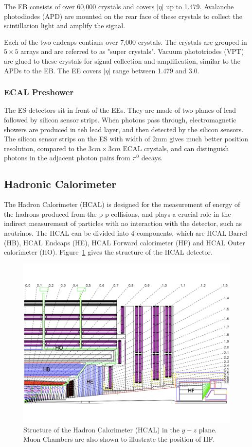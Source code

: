 \vspace{0.3cm}
The EB consists of over 60,000 crystals and covers $|\eta|$ up to 1.479. Avalanche photodiodes (APD) are mounted on the rear face of these crystals to collect the scintillation light and amplify the signal. 

\vspace{0.3cm}
Each of the two endcaps contians over 7,000 crystals. The crystals are grouped in $5\times 5$ arrays and are referred to as "super crystals". Vacuum phototriodes (VPT) are glued to these crystals for signal collection and amplification, similar to the APDs to the EB. The EE covers $|\eta|$ range between 1.479 and 3.0. 

\subsubsection{ECAL Preshower}
The ES detectors sit in front of the EEs. They are made of two planes of lead followed by silicon sensor strips. When photons pass through, electromagnetic showers are produced in teh lead layer, and then detected by the silicon sensors. The silicon sensor strips on the ES with width of 2mm gives much better position resolution, compared to the $3cm\times 3cm$ ECAL crystals, and can distinguish photons in the adjacent photon pairs from $\pi^{0}$ decays.

\subsection{Hadronic Calorimeter} 
The Hadron Calorimeter (HCAL)\cite{lhc_hcaldesign} is designed for the measurement of energy of the hadrons produced from the p-p collisions, and plays a crucial role in the indirect measurement of particles with no interaction with the detector, such as neutrinos. The HCAL can be divided into 4 components, which are HCAL Barrel (HB), HCAL Endcaps (HE), HCAL Forward calorimeter (HF) and HCAL Outer calorimeter (HO). Figure~\ref{fig:lhc_hcaldesign} gives the structure of the HCAL detector.
\begin{figure}[htbp]
\begin{center}
\includegraphics[width=0.7\linewidth]{figures/lhc_hcaldesign.pdf}
\caption{Structure of the Hadron Calorimeter (HCAL) in the $y-z$ plane. Muon Chambers are also shown to illustrate the position of HF.}
\label{fig:lhc_hcaldesign}
\end{center}
\end{figure}

